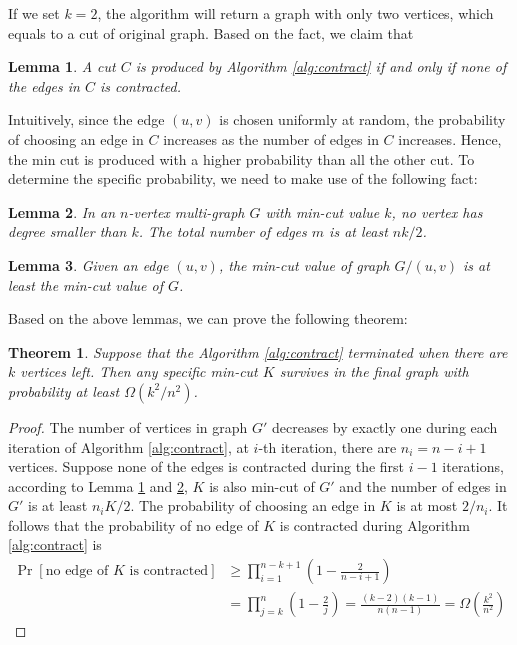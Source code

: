 \documentclass[11pt]{article}
\theoremstyle{plain}
\newtheorem{lemma}{Lemma}[section]
\newtheorem{theorem}{Theorem}[section]
\begin{document}
If we set $k=2$, the algorithm will return a graph with only two vertices, which equals to a cut of original graph. Based on the fact, we claim that

\begin{lemma}
    \label{lemma:cut}
    A cut $C$ is produced by Algorithm \ref{alg:contract} if and only if none of the edges in $C$ is contracted.
\end{lemma}

Intuitively, since the edge $(u,v)$ is chosen uniformly at random, the probability of choosing an edge in $C$ increases as the number of edges in $C$ increases. Hence, the min cut is produced with a higher probability than all the other cut. To determine the specific probability, we need to make use of the following fact:

\begin{lemma}
    \label{lemma:degree}
    In an $n$-vertex multi-graph $G$ with min-cut value $k$, no vertex has degree smaller than $k$. The total number of edges $m$ is at least $nk/2$.
\end{lemma}

\begin{lemma}
    \label{lemma:contract}
    Given an edge $(u,v)$, the min-cut value of graph $G/(u,v)$ is at least the min-cut value of $G$.
\end{lemma}

Based on the above lemmas, we can prove the following theorem:

\begin{theorem}
    \label{theorem:contract}
    Suppose that the Algorithm \ref{alg:contract} terminated when there are $k$ vertices left. Then any specific min-cut $K$ survives in the final graph with probability at least $\Omega(k^2/n^2)$.
\end{theorem}
\begin{proof}
    The number of vertices in graph $G'$ decreases by exactly one during each iteration of Algorithm \ref{alg:contract}, at $i$-th iteration, there are $n_i=n-i+1$ vertices. Suppose none of the edges is contracted during the first $i-1$ iterations, according to Lemma \ref{lemma:cut} and \ref{lemma:degree}, $K$ is also min-cut of $G'$ and the number of edges in $G'$ is at least $n_iK/2$. The probability of choosing an edge in $K$ is at most $2/n_i$. It follows that the probability of no edge of $K$ is contracted during Algorithm \ref{alg:contract} is
\begin{align*}
    \Pr[\text{no edge of }K\text{ is contracted}]&\ge\prod_{i=1}^{n-k+1}\left(1-\frac{2}{n-i+1}\right)\\
    &=\prod_{j=k}^n\left(1-\frac{2}{j}\right)=\frac{(k-2)(k-1)}{n(n-1)}=\Omega\left(\frac{k^2}{n^2}\right)
\end{align*}
\end{proof}
\end{document}
